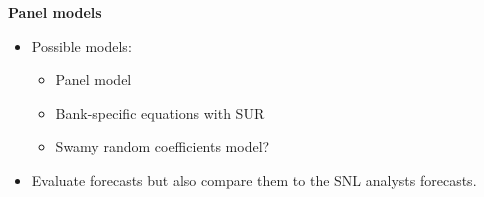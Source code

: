 \documentclass[11pt]{article}
\begin{document}
\textbf{Panel models}
\begin{itemize}
\item  Possible models: 
\begin{itemize}
\item Panel model
\item Bank-specific equations with SUR
\item Swamy random coefficients model?
\end{itemize}
\item Evaluate forecasts but also compare them to the SNL analysts forecasts.
\end{itemize}
\end{document}
